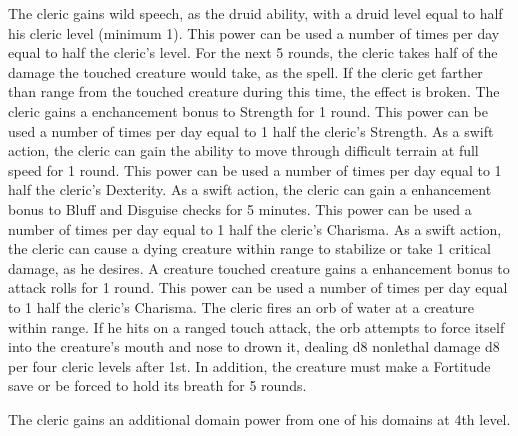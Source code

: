  The cleric gains wild speech, as the druid ability, with a druid level equal to half his cleric level (minimum 1). This power can be used a number of times per day equal to half the cleric's level.
 For the next 5 rounds, the cleric takes half of the damage the touched creature would take, as the  spell. If the cleric get farther than \rngmed range from the touched creature during this time, the effect is broken.
 The cleric gains a  enchancement bonus to Strength for 1 round. \bonusscalingdescription This power can be used a number of times per day equal to 1 \add half the cleric's Strength.
 As a swift action, the cleric can gain the ability to move through difficult terrain at full speed for 1 round. This power can be used a number of times per day equal to 1 \add half the cleric's Dexterity.
 As a swift action, the cleric can gain a  enhancement bonus to Bluff and Disguise checks for 5 minutes. This power can be used a number of times per day equal to 1 \add half the cleric's Charisma.
 As a swift action, the cleric can cause a dying creature within \rngmed range to stabilize or take 1 critical damage, as he desires.
 A creature touched creature gains a  enhancement bonus to attack rolls for 1 round. \bonusscalingdescription This power can be used a number of times per day equal to 1 \add half the cleric's Charisma.
 The cleric fires an orb of water at a creature within \rngclose range. If he hits on a ranged touch attack, the orb attempts to force itself into the creature's mouth and nose to drown it, dealing d8 nonlethal damage \add d8 per four cleric levels after 1st. In addition, the creature must make a Fortitude save or be forced to hold its breath for 5 rounds.

The cleric gains an additional domain power from one of his domains at 4th level.

